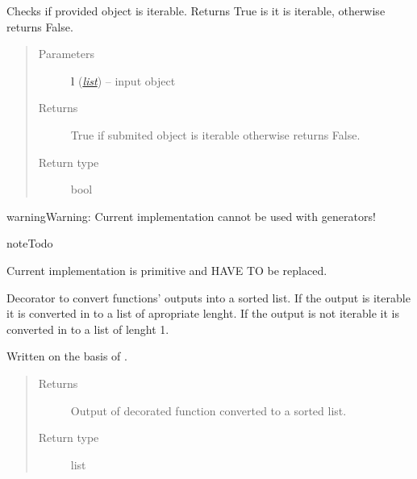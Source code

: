 \documentclass[a4paper,10pt,english]{sphinxmanual}
\begin{document}
\begin{fulllineitems}
\label{aqueduct.utils.helpers:aqueduct.utils.helpers.is_iterable}
Checks if provided object is iterable.
Returns True is it is iterable, otherwise returns False.
\begin{quote}\begin{description}
\item[{Parameters}] \leavevmode
\textbf{l} (\href{http://docs.python.org/2/library/functions.html\#list}{\emph{list}}) -- input object

\item[{Returns}] \leavevmode
True if submited object is iterable otherwise returns False.

\item[{Return type}] \leavevmode
bool

\end{description}\end{quote}

\begin{notice}{warning}{Warning:}
Current implementation cannot be used with generators!
\end{notice}

\begin{notice}{note}{Todo}

Current implementation is primitive and HAVE TO be replaced.
\end{notice}

\end{fulllineitems}


\begin{fulllineitems}
\label{aqueduct.utils.helpers:aqueduct.utils.helpers.sortify}
Decorator to convert functions' outputs into a sorted list. If the output is iterable it is converted in to a list
of apropriate lenght. If the output is not iterable it is converted in to a list of lenght 1.

Written on the basis of {\hyperref[aqueduct.utils.helpers:aqueduct.utils.helpers.listify]{}}.
\begin{quote}\begin{description}
\item[{Returns}] \leavevmode
Output of decorated function converted to a sorted list.

\item[{Return type}] \leavevmode
list

\end{description}\end{quote}

\end{fulllineitems}
\end{document}
